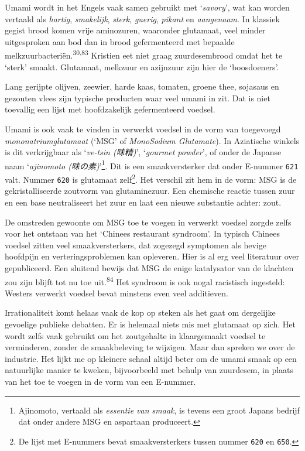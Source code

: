 \documentclass[
  11pt,
  dutch,
]{memoir}
\begin{document}
Umami wordt in het Engels vaak samen gebruikt met `\emph{savory}', wat
kan worden vertaald als \emph{hartig}, \emph{smakelijk}, \emph{sterk},
\emph{guerig}, \emph{pikant} en \emph{aangenaam}. In klassiek gegist
brood komen vrije aminozuren, waaronder glutamaat, veel minder
uitgesproken aan bod dan in brood gefermenteerd met bepaalde
melkzuurbacteriën.\textsuperscript{30,83} Kristien eet niet graag
zuurdesembrood omdat het te `sterk' smaakt. Glutamaat, melkzuur en
azijnzuur zijn hier de `boosdoeners'.

Lang gerijpte olijven, zeewier, harde kaas, tomaten, groene thee,
sojasaus en gezouten vlees zijn typische producten waar veel umami in
zit. Dat is niet toevallig een lijst met hoofdzakelijk gefermenteerd
voedsel.

Umami is ook vaak te vinden in verwerkt voedsel in de vorm van
toegevoegd \emph{mononatriumglutamaat} (`MSG' of \emph{MonoSodium
Glutamate}). In Aziatische winkels is dit verkrijgbaar als
`\emph{ve-tsin (味精)}', `\emph{gourmet powder}', of onder de Japanse
naam `\emph{ajinomoto (味の素)}'\footnote{Ajinomoto, vertaald als
  \emph{essentie van smaak}, is tevens een groot Japans bedrijf dat
  onder andere MSG en aspartaan produceert.}. Dit is een smaakversterker
dat onder E-nummer \texttt{621} valt. Nummer \texttt{620} is glutamaat
zelf\footnote{De lijst met E-nummers bevat smaakversterkers tussen
  nummer \texttt{620} en \texttt{650}.}. Het verschil zit hem in de
vorm: MSG is de gekristalliseerde zoutvorm van glutaminezuur. Een
chemische reactie tussen zuur en een base neutraliseert het zuur en laat
een nieuwe substantie achter: zout.

De omstreden gewoonte om MSG toe te voegen in verwerkt voedsel zorgde
zelfs voor het ontstaan van het `Chinees restaurant syndroom'. In
typisch Chinees voedsel zitten veel smaakversterkers, dat zogezegd
symptomen als hevige hoofdpijn en verteringsproblemen kan opleveren.
Hier is al erg veel literatuur over gepubliceerd. Een sluitend bewijs
dat MSG de enige katalysator van de klachten zou zijn blijft tot nu toe
uit.\textsuperscript{84} Het syndroom is ook nogal racistisch ingesteld:
Westers verwerkt voedsel bevat minstens even veel additieven.

Irrationaliteit komt helaas vaak de kop op steken als het gaat om
dergelijke gevoelige publieke debatten. Er is helemaal niets mis met
glutamaat op zich. Het wordt zelfs vaak gebruikt om het zoutgehalte in
klaargemaakt voedsel te verminderen, zonder de smaakbeleving te
wijzigen. Maar dan spreken we over de industrie. Het lijkt me op
kleinere schaal altijd beter om de umami smaak op een natuurlijke manier
te kweken, bijvoorbeeld met behulp van zuurdesem, in plaats van het toe
te voegen in de vorm van een E-nummer.
\end{document}
